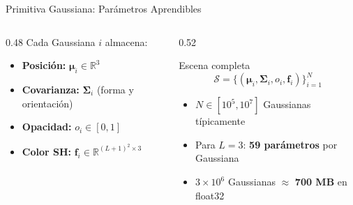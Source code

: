 \begin{frame}{Primitiva Gaussiana: Parámetros Aprendibles}
  \begin{columns}
    \begin{column}{0.48\textwidth}
      Cada Gaussiana $i$ almacena:
      \begin{itemize}
        \item \textbf{Posición:} $\boldsymbol{\mu}_i \in \mathbb{R}^3$
        \item \textbf{Covarianza:} $\boldsymbol{\Sigma}_i$ (forma y orientación)
        \item \textbf{Opacidad:} $o_i \in [0,1]$
        \item \textbf{Color SH:} $\mathbf{f}_i \in \mathbb{R}^{(L+1)^2 \times 3}$
      \end{itemize}
    \end{column}
    \begin{column}{0.52\textwidth}
      \begin{block}{Escena completa}
        \[
          \mathcal{S} = \{(\boldsymbol{\mu}_i, \boldsymbol{\Sigma}_i, o_i, \mathbf{f}_i)\}_{i=1}^{N}
        \]
        \begin{itemize}
          \item $N \in [10^5, 10^7]$ Gaussianas típicamente
          \item Para $L=3$: \textbf{59 parámetros} por Gaussiana
          \item $3\times10^6$ Gaussianas $\approx$ \textbf{700 MB} en float32
        \end{itemize}
      \end{block}
    \end{column}
  \end{columns}
\end{frame}
